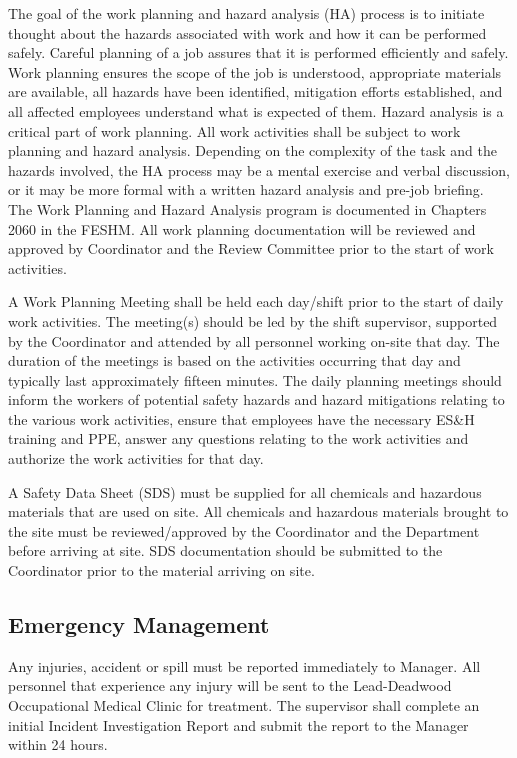 The goal of the work planning and hazard analysis (HA) process is to
initiate thought about the hazards associated with work and how it can
be performed safely. Careful planning of a job assures that it is
performed efficiently and safely. Work planning ensures the scope of
the job is understood, appropriate materials are available, all
hazards have been identified, mitigation efforts established, and all
affected employees understand what is expected of them. Hazard
analysis is a critical part of work planning. All work activities
shall be subject to work planning and hazard analysis. Depending on
the complexity of the task and the hazards involved, the HA process
may be a mental exercise and verbal discussion, or it may be more
formal with a written hazard analysis and pre-job briefing. The Work
Planning and Hazard Analysis program is documented in Chapters 2060 in
the FESHM. All work planning documentation will be reviewed and
approved by   Coordinator and the 
 Review Committee prior to the start of work activities.

A Work Planning Meeting shall be held each day/shift prior to the
start of daily work activities. The meeting(s) should be led by the
shift supervisor, supported by the  Coordinator and
attended by all personnel working on-site that day. The duration of
the meetings is based on the activities occurring that day and
typically last approximately fifteen minutes. The daily planning
meetings should inform the workers of potential safety hazards and
hazard mitigations relating to the various work activities, ensure
that employees have the necessary ES\&H training and PPE, answer any
questions relating to the work activities and authorize the work
activities for that day.

A Safety Data Sheet (SDS) must be supplied for all chemicals and
hazardous materials that are used on site. All chemicals and hazardous
materials brought to the \surf site must be reviewed/approved by the
  Coordinator and the \surf {}
Department before arriving at site.  SDS documentation should be
submitted to the   Coordinator prior to the
material arriving on site.

\subsection{Emergency Management}

Any injuries, accident or spill must be reported immediately to 
 Manager. All personnel that experience any injury will be sent to
the Lead-Deadwood Occupational Medical Clinic for treatment. The
supervisor shall complete an initial Incident Investigation Report and
submit the report to the   Manager within 24 hours.

